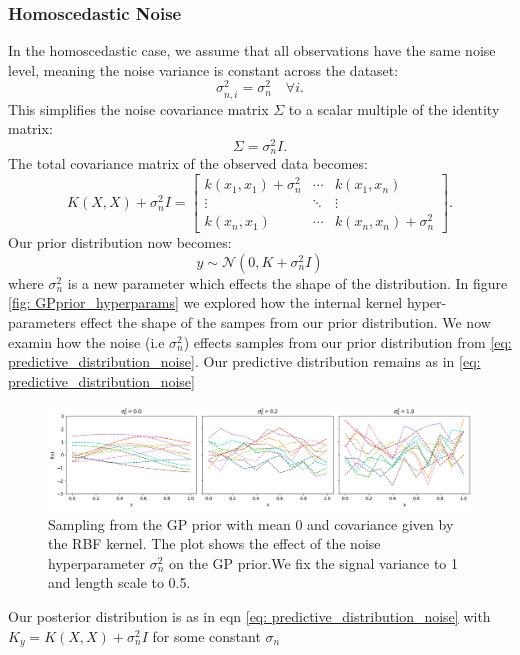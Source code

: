 \documentclass[12pt]{article}
\begin{document}
\subsubsection*{Homoscedastic Noise} 

In the homoscedastic case, we assume that all observations have the same noise level, meaning the noise variance is constant across the dataset:
\[
\sigma_{n,i}^2 = \sigma_n^2 \quad \forall i.
\]
This simplifies the noise covariance matrix \( \Sigma \) to a scalar multiple of the identity matrix:
\[
\Sigma = \sigma_n^2 I.
\]
The total covariance matrix of the observed data becomes:
\[
K(X, X) + \sigma_n^2 I = 
\begin{bmatrix}
k(x_1, x_1) + \sigma_n^2 & \cdots & k(x_1, x_n) \\
\vdots & \ddots & \vdots \\
k(x_n, x_1) & \cdots & k(x_n, x_n) + \sigma_n^2
\end{bmatrix}.
\]
Our prior distribution now becomes:
\begin{equation}
y \sim \mathcal{N}(0, K+\sigma_n^2 I)
\label{eq: prior_withnoise}
\end{equation}
where $\sigma_n^2$ is a new parameter which effects the shape of the distribution. In figure \ref{fig: GPprior_hyperparams} we 
explored how the internal kernel hyper-parameters effect the shape of the sampes from our prior distribution. We now examin how the noise (i.e $\sigma_n^2$) effects samples from our prior distribution from \ref{eq:  predictive_distribution_noise}.
Our predictive distribution remains as in \ref{eq: predictive_distribution_noise}

\begin{figure}[H]
    \centering
        \includegraphics[width=\textwidth]{LatexPlots/1dplots/Kernel_noise.png}
        \caption{Sampling from the GP prior with mean 0 and covariance given by the RBF kernel.
        The plot shows the effect of the noise hyperparameter \(\sigma_n^2\) on the GP prior.We fix the signal variance to 1 and length scale to 0.5.}
    \label{fig: kernel_noise}
\end{figure}
\noindent
Our posterior distribution is as in eqn \ref{eq:  predictive_distribution_noise} with \(K_y = K(X, X) + \sigma_n^2 I \) for some constant \(\sigma_n\)
\end{document}
